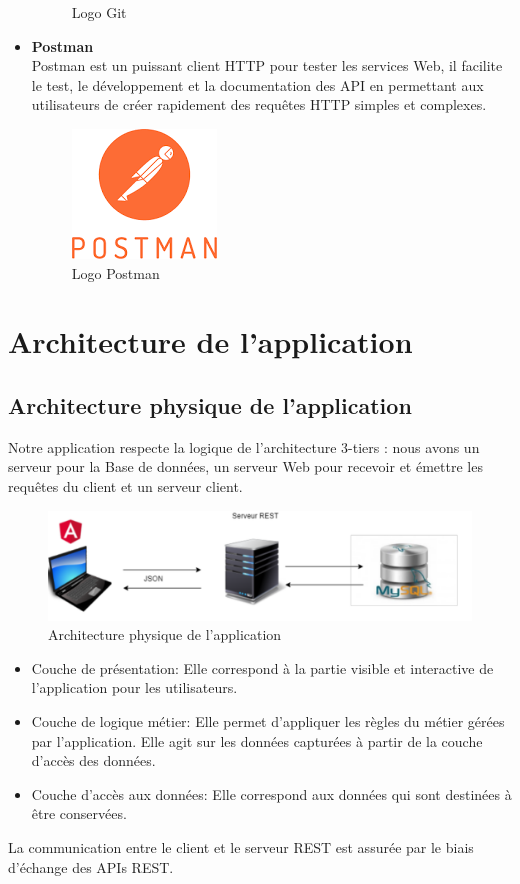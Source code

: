 \begin{itemize}
\begin{figure}[H]
	\caption{Logo Git}
	\label{Logo Git}
\end{figure} 
\item \textbf{Postman} \\ Postman est un puissant client HTTP pour tester les services Web, il facilite le test, le développement et la documentation des API en permettant aux utilisateurs de créer rapidement des requêtes HTTP simples et complexes.
	\begin{figure}[H]
	\centering
	\includegraphics[scale=0.7]{postman.png}
	\caption{Logo Postman}
	\label{Logo Postman}
\end{figure} 

\end{itemize}

\section{Architecture de l'application}
\subsection{Architecture physique de l'application}
Notre application respecte la logique de l'architecture 3-tiers : nous avons un serveur pour la
Base de données, un serveur Web pour recevoir et émettre les requêtes du client et un serveur client.
	\begin{figure}[h]
	\centering
	\includegraphics[scale=0.5]{archiphy.PNG}
	\caption{Architecture physique de l'application}
	\label{Architecture physique de l'application}
\end{figure} 
\begin{itemize}
	\item Couche de présentation: Elle correspond à la partie visible et interactive de l'application
	pour les utilisateurs.
	\item Couche de logique métier: Elle permet d'appliquer les règles du métier gérées par
	l'application. Elle agit sur les données capturées à partir de la couche d'accès des données.
	\item Couche d'accès aux données: Elle correspond aux données qui sont destinées à être conservées.
\end{itemize}
La communication entre le client et le serveur REST est assurée par le biais d'échange des APIs REST.
